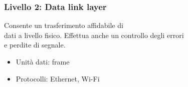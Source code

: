 \documentclass[aspectratio=169]{beamer}
\begin{document}
    \begin{frame}
        \frametitle{Livello 2: Data link layer}
        Consente un trasferimento affidabile di\\dati a livello fisico.
        \vskip 0.3cm
        Effettua anche un controllo degli errori\\ e perdite di segnale.
        \begin{itemize}
            \item Unità dati: frame
            \item Protocolli: Ethernet, Wi-Fi
        \end{itemize}
    \end{frame}
    
\end{document}
